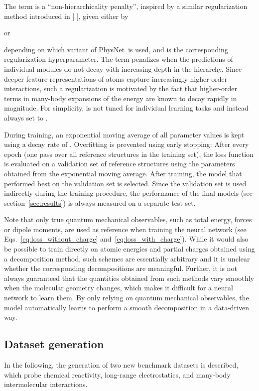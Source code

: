 \documentclass[12pt]{article}
\makeatletter
\DeclareRobustCommand\citenum
{\begingroup
	\NAT@swatrue\let\NAT@ctype\z@\NAT@parfalse\let\textsuperscript\relax \NAT@citexnum[][]}
\newcommand{\nn}{PhysNet}
\makeatother
\begin{document}
The term  is a ``non-hierarchicality penalty'',
inspired by a similar regularization method introduced in
[\citenum{lubbers2018hierarchical}], given either by

or

depending on which variant of \nn\ is used, and  is
the corresponding regularization hyperparameter. The  term penalizes when the predictions of individual modules do
not decay with increasing depth in the hierarchy. Since deeper feature
representations of atoms capture increasingly higher-order
interactions, such a regularization is motivated by the fact that
higher-order terms in many-body expansions of the energy are known to
decay rapidly in magnitude. For simplicity,  is not
tuned for individual learning tasks and instead always set to
.

During training, an exponential moving average of all parameter values
is kept using a decay rate of . Overfitting is prevented using
early stopping:\cite{prechelt2012early} After every epoch (one pass
over all reference structures in the training set), the loss function
is evaluated on a validation set of reference structures using the
parameters obtained from the exponential moving average. After
training, the model that performed best on the validation set is
selected. Since the validation set is used indirectly during the
training procedure, the performance of the final models (see
section~\ref{sec:results}) is always measured on a separate test set.

Note that only true quantum mechanical observables, such as total
energy, forces or dipole moments, are used as reference when training
the neural network (see Eqs.~\ref{eq:loss_without_charge}
and~\ref{eq:loss_with_charge}). While it would also be possible to
train directly on atomic energies and partial charges obtained using a
decomposition
method,\cite{hirshfeld1977bonded,blanco2005interacting,francisco2006molecular,mitoraj2009combined}
such schemes are essentially arbitrary and it is unclear whether the
corresponding decompositions are meaningful. Further, it is not always
guaranteed that the quantities obtained from such methods vary
smoothly when the molecular geometry changes, which makes it difficult
for a neural network to learn them. By only relying on quantum
mechanical observables, the model automatically learns to perform a
smooth decomposition in a data-driven way.

\subsection{Dataset generation}
\label{sec:dataset_generation}
In the following, the generation of two new benchmark datasets is
described, which probe chemical reactivity, long-range electrostatics,
and many-body intermolecular interactions.
\end{document}

